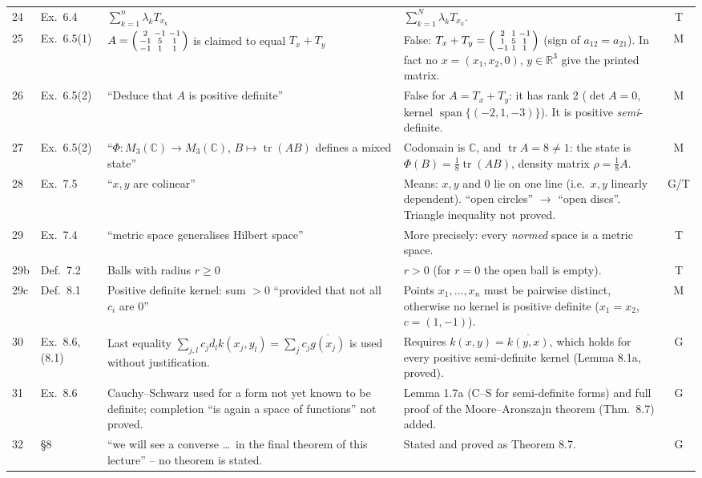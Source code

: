 \documentclass[11pt,a4paper]{article}
\numberwithin{equation}{section}
\newcommand{\R}{\mathbb{R}}
\newcommand{\C}{\mathbb{C}}
\newcommand{\conj}[1]{\overline{#1}}
\DeclareMathOperator{\tr}{tr}
\DeclareMathOperator{\spn}{span}
\theoremstyle{plain}
\theoremstyle{definition}
\theoremstyle{plain}
\theoremstyle{definition}
\begin{document}
{\begin{longtable}{@{}p{0.6cm}p{1.9cm}p{5.6cm}p{6.0cm}c@{}}
24 & Ex.~6.4 & $\sum_{k=1}^{n}\lambda_kT_{x_k}$ & $\sum_{k=1}^{N}\lambda_kT_{x_k}$. & T\\
25 & Ex.~6.5(1) & $A=\begin{psmallmatrix}2&-1&-1\\-1&5&1\\-1&1&1\end{psmallmatrix}$ is claimed to equal $T_x+T_y$ & False: $T_x+T_y=\begin{psmallmatrix}2&1&-1\\1&5&1\\-1&1&1\end{psmallmatrix}$ (sign of $a_{12}=a_{21}$). In fact no $x=(x_1,x_2,0)$, $y\in\R^3$ give the printed matrix. & M\\
26 & Ex.~6.5(2) & ``Deduce that $A$ is positive definite'' & False for $A=T_x+T_y$: it has rank 2 ($\det A=0$, kernel $\spn\{(-2,1,-3)\}$). It is positive \emph{semi}-definite. & M\\
27 & Ex.~6.5(2) & ``$\Phi:M_3(\C)\to M_3(\C)$, $B\mapsto\tr(AB)$ defines a mixed state'' & Codomain is $\C$, and $\tr A=8\neq1$: the state is $\Phi(B)=\frac18\tr(AB)$, density matrix $\rho=\frac18A$. & M\\
28 & Ex.~7.5 & ``$x,y$ are colinear'' & Means: $x,y$ and $0$ lie on one line (i.e.\ $x,y$ linearly dependent). ``open circles'' $\to$ ``open discs''. Triangle inequality not proved. & G/T\\
29 & Ex.~7.4 & ``metric space generalises Hilbert space'' & More precisely: every \emph{normed} space is a metric space. & T\\
29b & Def.~7.2 & Balls with radius $r\ge0$ & $r>0$ (for $r=0$ the open ball is empty). & T\\
29c & Def.~8.1 & Positive definite kernel: sum $>0$ ``provided that not all $c_i$ are $0$'' & Points $x_1,\dots,x_n$ must be pairwise distinct, otherwise no kernel is positive definite ($x_1=x_2$, $c=(1,-1)$). & M\\
30 & Ex.~8.6, (8.1) & Last equality $\sum_{j,l}c_j\conj{d_l}k(x_j,y_l)=\sum_jc_j\conj{g(x_j)}$ is used without justification. & Requires $k(x,y)=\conj{k(y,x)}$, which holds for every positive semi-definite kernel (Lemma 8.1a, proved). & G\\
31 & Ex.~8.6 & Cauchy--Schwarz used for a form not yet known to be definite; completion ``is again a space of functions'' not proved. & Lemma 1.7a (C--S for semi-definite forms) and full proof of the Moore--Aronszajn theorem (Thm.~8.7) added. & G\\
32 & \S8 & ``we will see a converse \dots\ in the final theorem of this lecture'' -- no theorem is stated. & Stated and proved as Theorem 8.7. & G\\
\bottomrule
\end{longtable}
}
\newpage
\end{document}
